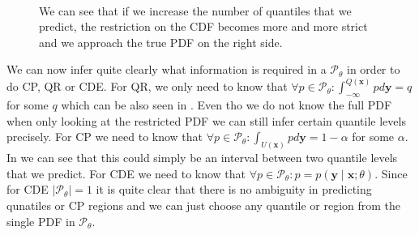 \begin{figure}
    \centering
    \\
    
    \caption{We can see that if we increase the number of quantiles that we predict, the restriction on the CDF becomes more and more strict and we approach the true PDF on the right side.}
\end{figure}

We can now infer quite clearly what information is required in a $\mathcal{P}_{\theta}$ in order to do CP, QR or CDE. For QR, we only need to know that $\forall p\in\mathcal{P}_\theta: \int_{-\infty}^{Q(\mathbf{x})} p d\mathbf{y} = q$ for some $q$ which can be also seen in . Even tho we do not know the full PDF when only looking at the restricted PDF we can still infer certain quantile levels precisely. For CP we need to know that $\forall p\in\mathcal{P}_\theta: \int_{U(\mathbf{x})} p d\mathbf{y} = 1 - \alpha$ for some $\alpha$. In  we can see that this could simply be an interval between two quantile levels that we predict. For CDE we need to know that $\forall p\in\mathcal{P}_\theta: p = p(\mathbf{y} \mid \mathbf{x}; \theta)$. Since for CDE $|\mathcal{P}_\theta| = 1$ it is quite clear that there is no ambiguity in predicting qunatiles or CP regions and we can just choose any quantile or region from the single PDF in $\mathcal{P}_\theta$.

